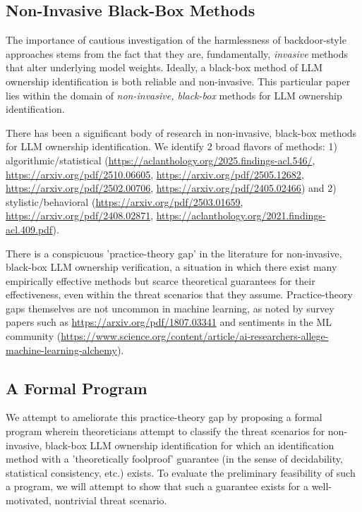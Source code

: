 \documentclass{article}
\begin{document}
\subsection{Non-Invasive Black-Box Methods}

The importance of cautious investigation of the harmlessness of backdoor-style approaches stems from the fact that they are, fundamentally, \textit{invasive} methods that alter underlying model weights. Ideally, a black-box method of LLM ownership identification is both reliable and non-invasive. This particular paper lies within the domain of \textit{non-invasive, black-box }methods for LLM ownership identification.



There has been a significant body of research in non-invasive, black-box methods for LLM ownership identification. We identify 2 broad flavors of methods: 1) algorithmic/statistical (\url{https://aclanthology.org/2025.findings-acl.546/}, \url{https://arxiv.org/pdf/2510.06605}, \url{https://arxiv.org/pdf/2505.12682}, \url{https://arxiv.org/pdf/2502.00706}, \url{https://arxiv.org/pdf/2405.02466}) and 2) stylistic/behavioral (\url{https://arxiv.org/pdf/2503.01659}, \url{https://arxiv.org/pdf/2408.02871}, \url{https://aclanthology.org/2021.findings-acl.409.pdf}).


There is a conspicuous 'practice-theory gap' in the literature for non-invasive, black-box LLM ownership verification, a situation in which there exist many empirically effective methods but scarce theoretical guarantees for their effectiveness, even within the threat scenarios that they assume. Practice-theory gaps themselves are not uncommon in machine learning, as noted by survey papers such as \url{https://arxiv.org/pdf/1807.03341} and sentiments in the ML community (\url{https://www.science.org/content/article/ai-researchers-allege-machine-learning-alchemy}).



\subsection{A Formal Program}



We attempt to ameliorate this practice-theory gap by proposing a formal program wherein theoreticians attempt to classify the threat scenarios for non-invasive, black-box LLM ownership identification for which an identification method with a 'theoretically foolproof' guarantee (in the sense of decidability, statistical consistency, etc.) exists. To evaluate the preliminary feasibility of such a program, we will attempt to show that such a guarantee exists for a well-motivated, nontrivial threat scenario.
\end{document}
